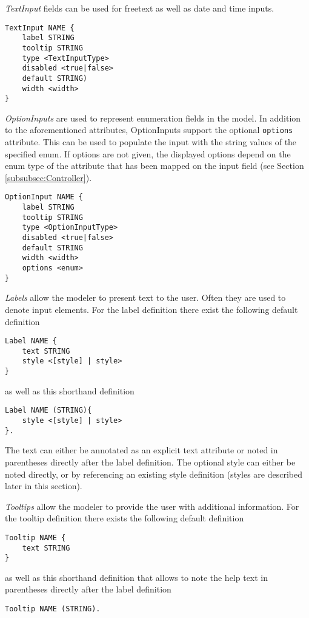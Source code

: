 \textit{TextInput} fields can be used for freetext as well as date and time inputs.
\begin{lstlisting}
TextInput NAME { 
	label STRING
	tooltip STRING
	type <TextInputType>
	disabled <true|false>
	default STRING)
	width <width>
}
\end{lstlisting}

\textit{OptionInputs} are used to represent enumeration fields in the model. In addition to the aforementioned attributes, OptionInputs support the optional \lstinline!options! attribute. This can be used to populate the input with the string values of the specified enum. If options are not given, the displayed options depend on the enum type of the attribute that has been mapped on the input field (see Section \ref{subsubsec:Controller}).
\begin{lstlisting}
OptionInput NAME { 
	label STRING
	tooltip STRING
	type <OptionInputType>
	disabled <true|false>
	default STRING
	width <width>
	options <enum>
}
\end{lstlisting}

\textit{Labels} allow the modeler to present text to the user. Often they are used to denote input elements. For the label definition there exist the following default definition
\begin{lstlisting}
Label NAME {
	text STRING
	style <[style] | style>
}
\end{lstlisting}
as well as this shorthand definition
\begin{lstlisting}
Label NAME (STRING){
	style <[style] | style>
}.
\end{lstlisting}

The text can either be annotated as an explicit text attribute or noted in parentheses directly after the label definition. The optional style can either be noted directly, or by referencing an existing style definition (styles are described later in this section).

\textit{Tooltips} allow the modeler to provide the user with additional information. For the tooltip definition there exists the following default definition
\begin{lstlisting}
Tooltip NAME {
	text STRING
}
\end{lstlisting}

as well as this shorthand definition that allows to note the help text in parentheses directly after the label definition
\begin{lstlisting}
Tooltip NAME (STRING).
\end{lstlisting}

